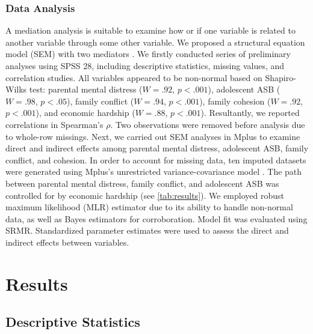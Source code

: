 \documentclass{sn-jnl}                  %
\begin{document}
\subsubsection{Data Analysis}

A mediation analysis is suitable to examine how or if one variable is related to another variable through some other variable. We proposed a structural equation model (SEM) with two mediators \citep{mackinnon:2008, rucker:2011}. We firstly conducted series of preliminary analyses using \textsf{SPSS} 28, including descriptive statistics, missing values, and correlation studies. All variables appeared to be non-normal based on Shapiro-Wilks test: parental mental distress ($W = .92$, $p < .001$), adolescent ASB ($W = .98$, $p < .05$), family conflict ($W = .94$, $p < .001$), family cohesion ($W = .92$, $p < .001$), and economic hardship ($W = .88$, $p < .001$). Resultantly, we reported correlations in Spearman's $\rho$. Two observations were removed before analysis due to whole-row missings. Next, we carried out SEM analyses in \textsf{Mplus} \citep[Version 8.3, ][]{muthen:2017} to examine direct and indirect effects among parental mental distress, adolescent ASB, family conflict, and cohesion. In order to account for missing data, ten imputed datasets were generated using \textsf{Mplus}'s unrestricted variance-covariance model \citep[``JM-AM H1'',][]{asparouhov:2022}. The path between parental mental distress, family conflict, and adolescent ASB was controlled for by economic hardship (see \cref{tab:results}). We employed robust maximum likelihood (MLR) estimator due to its ability to handle non-normal data, as well as Bayes estimators for corroboration. Model fit was evaluated using SRMR. Standardized parameter estimates were used to assess the direct and indirect effects between variables.

\section{Results}

\subsection{Descriptive Statistics}
\end{document}
